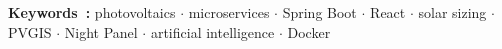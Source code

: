 \vspace{4pt}
\noindent\small\textbf{Keywords~:}
\textcolor{isetblue}{photovoltaics} $\cdot$
\textcolor{isetblue}{microservices} $\cdot$
\textcolor{isetblue}{Spring Boot} $\cdot$
\textcolor{isetblue}{React} $\cdot$
\textcolor{isetblue}{solar sizing} $\cdot$
\textcolor{isetblue}{PVGIS} $\cdot$
\textcolor{isetblue}{Night Panel} $\cdot$
\textcolor{isetblue}{artificial intelligence} $\cdot$
\textcolor{isetblue}{Docker}

\cleardoublepage
